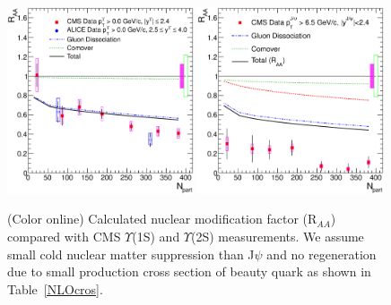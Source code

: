 \documentclass[aps,prc,preprint,superscriptaddress,showpacs,showkeys]{revtex4-1}
\begin{document}
\begin{figure}
\includegraphics[width=0.49\textwidth]{CMS_RAA_Upsilon1S.eps}
\includegraphics[width=0.49\textwidth]{CMS_RAA_Upsilon2S.eps}
\caption{(Color online) Calculated nuclear modification factor (R$_{AA}$) compared with CMS $\Upsilon$(1S) and $\Upsilon$(2S) measurements.
We assume small cold nuclear matter suppression than J$\psi$ and no regeneration due to small production cross section of beauty quark as shown in Table~\ref{NLOcros}.}
\label{fig:UpsilonRaa}
\end{figure}
\end{document}
